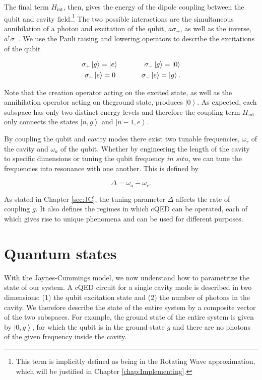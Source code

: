 \documentclass[11 pt, oneside]{book} %
\newcommand{\ket}[1]{\left| #1 \right>} %
\begin{document}
The final term $H_{\mathrm{int}}$, then, gives the energy of the dipole coupling between the qubit and cavity field.\footnote{This term is implicitly defined as being in the Rotating Wave approximation, which will be justified in Chapter \ref{chap:Implementing}.} The two possible interactions are the simultaneous annihilation of a photon and excitation of the qubit, $a\sigma_+$, as well as the inverse, $a^\dag \sigma_-$. We use the Pauli raising and lowering operators to describe the excitations of the qubit

\begin{eqnarray}
\sigma_+\ket{g} = \ket{e} \hspace{1.3cm} \sigma_-\ket{g} = \ket{0} \\
\sigma_+\ket{e} = 0\hspace{1.3cm} \sigma_-\ket{e} = \ket{g}. \nonumber
\end{eqnarray}

Note that the creation operator acting on the excited state, as well as the annihilation operator acting on theground state, produces $\ket{0}$. As expected, each subspace has only two distinct energy levels and therefore the coupling term $H_{\mathrm{int}}$ only connects the states $\ket{n,g}$ and $\ket{n-1,e}$.

By coupling the qubit and cavity modes there exist two tunable frequencies, $\omega_r$ of the cavity and $\omega_a$ of the qubit. Whether by engineering the length of the cavity to specific dimensions or tuning the qubit frequency $in$ $situ$, we can tune the frequencies into resonance with one another. This is defined by

\begin{equation}
\Delta = \omega_a - \omega_r.
\end{equation}

As stated in Chapter \ref{sec:JC}, the tuning parameter $\Delta$ affects the rate of coupling $g$. It also defines the regimes in which cQED can be operated, each of which gives rise to unique phenomena and can be used for different purposes. 

\section{Quantum states}
With the Jaynes-Cummings model, we now understand how to parametrize the state of our system. A cQED circuit for a single cavity mode is described in two dimensions: (1) the qubit excitation state and (2) the number of photons in the cavity. We therefore describe the state of the entire system by a composite vector of the two subspaces. For example, the ground state of the entire system is given by $\ket{0,g}$, for which the qubit is in the ground state $g$ and there are no photons of the given frequency inside the cavity. 
\end{document}
